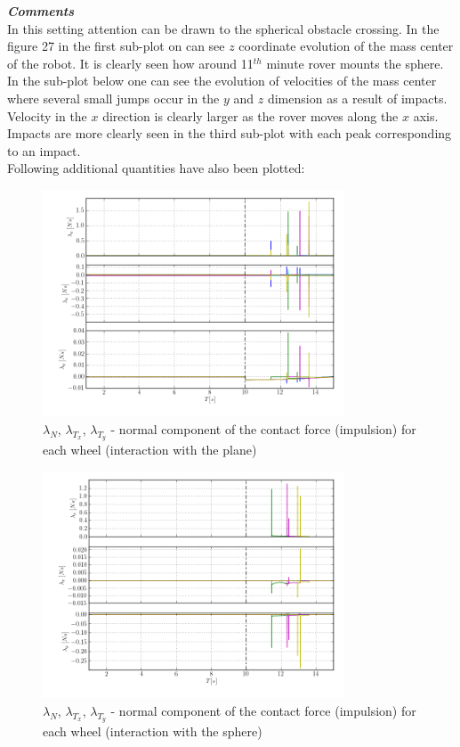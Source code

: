\noindent \textbf{\textit{\Large{Comments}}}\\[1mm]
\noindent In this setting attention can be drawn to the spherical obstacle crossing. In the figure 27 in the first sub-plot on can see $z$ coordinate evolution of the mass center of the robot. 
It is clearly seen how around 11$^{th}$ minute rover mounts the sphere. In the sub-plot below one can see the evolution of velocities of the mass center where several small jumps occur in the 
$y$ and $z$ dimension as a result of impacts. Velocity in the $x$ direction is clearly larger as the rover moves along the $x$ axis. Impacts are more clearly seen in the third sub-plot with each peak 
corresponding to an impact.\\
 
\noindent Following additional quantities have also been plotted:

\begin{figure}[H]
  \centering
    \includegraphics[width=0.8\textwidth]{lambdaNTS6}
  \caption{$\lambda_{N}$, $\lambda_{T_x}$, $\lambda_{T_y}$ - normal component of the contact force (impulsion) for each wheel (interaction with the plane)}
\end{figure}

\begin{figure}[H]
  \centering
    \includegraphics[width=0.8\textwidth]{lambdaNTS6sphere}
  \caption{$\lambda_{N}$, $\lambda_{T_x}$, $\lambda_{T_y}$ - normal component of the contact force (impulsion) for each wheel (interaction with the sphere)}
\end{figure}

